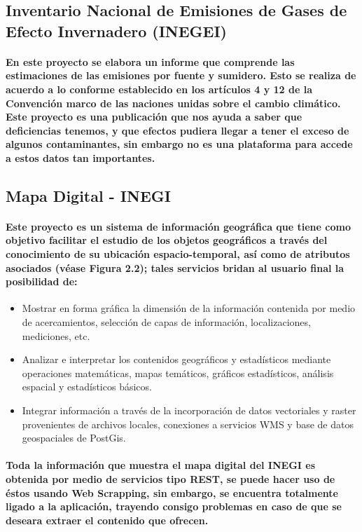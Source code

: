   \subsection {Inventario Nacional de Emisiones de Gases de Efecto Invernadero (INEGEI)}
    \paragraph {En este proyecto se elabora un informe que comprende las estimaciones de las emisiones por fuente y sumidero. Esto se realiza de acuerdo a lo conforme establecido en los artículos 4 y 12 de la Convención marco de las naciones unidas sobre el cambio climático. Este proyecto es una publicación que nos ayuda a saber que deficiencias tenemos, y que efectos pudiera llegar a tener el exceso de algunos contaminantes, sin embargo no es una plataforma para accede a estos datos tan importantes.}

  \subsection {Mapa Digital -  INEGI}
    \paragraph {Este proyecto es un sistema de información geográfica que tiene como objetivo facilitar el estudio de los objetos geográficos a través del conocimiento de su ubicación espacio-temporal, así como de atributos asociados (véase Figura 2.2);  tales servicios bridan al usuario final la posibilidad de:}

  \begin{itemize}
    \item {Mostrar en forma gráfica la dimensión de la información contenida por medio de acercamientos, selección de capas de información, localizaciones, mediciones, etc.}
    \item {Analizar e interpretar los contenidos geográficos y estadísticos mediante operaciones matemáticas, mapas temáticos, gráficos estadísticos, análisis espacial y estadísticos básicos.}
    \item {Integrar información a través de la incorporación de datos vectoriales y raster provenientes de archivos locales, conexiones a servicios WMS y base de datos geospaciales de PostGis.}
  \end{itemize}

  \paragraph{Toda la información que muestra el mapa digital del INEGI es obtenida por medio de servicios tipo REST, se puede hacer uso de éstos usando Web Scrapping, sin embargo, se encuentra totalmente ligado a la aplicación, trayendo consigo problemas en caso de que se deseara extraer el contenido que ofrecen.}

